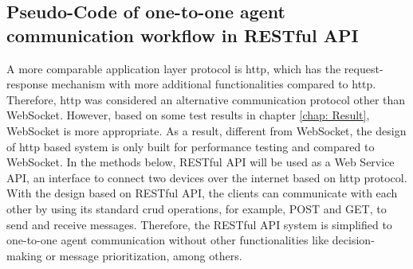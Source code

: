 \subsection{Pseudo-Code of one-to-one agent communication workflow in RESTful API}
A more comparable application layer protocol is \gls{http}, which has the request-response mechanism with more additional functionalities compared to \gls{http}. 
Therefore, \gls{http} was considered an alternative communication protocol other than WebSocket. 
However, based on some test results in chapter \ref{chap: Result}, WebSocket is more appropriate.
As a result, different from WebSocket, the design of \gls{http} based system is only built for performance testing and compared to WebSocket. In the methods below, RESTful API will be used as a Web Service API, an interface to connect two devices over the internet based on \gls{http} protocol. With the design based on RESTful API, the clients can communicate with each other by using its standard \gls{crud} operations, for example, POST and GET, to send and receive messages. 
Therefore, the RESTful API system is simplified to one-to-one agent communication without other functionalities like decision-making or message prioritization, among others.


